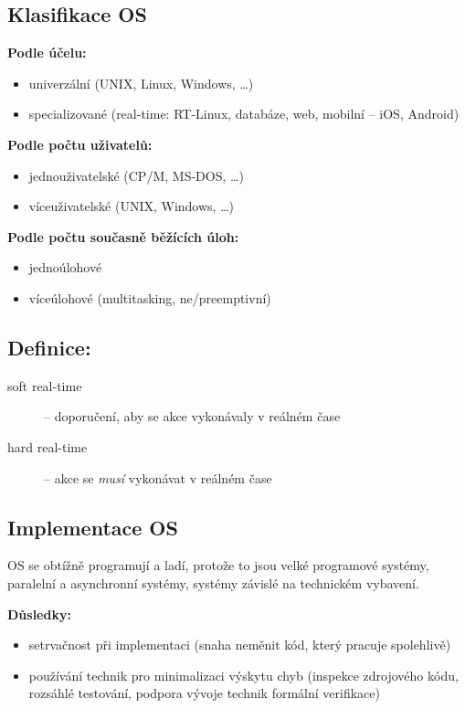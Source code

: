 \documentclass[a4paper, 11pt]{article}
\begin{document}
\newpage

\subsection{Klasifikace OS}

\textbf{Podle účelu:}
\begin{itemize}
    \item univerzální (UNIX, Linux, Windows, \ldots)
    \item specializované (real-time: RT-Linux, databáze, web, mobilní -- iOS, Android)
\end{itemize}

\textbf{Podle počtu uživatelů:}
\begin{itemize}
    \item jednouživatelské (CP/M, MS-DOS, \ldots)
    \item víceuživatelské (UNIX, Windows, \ldots)
\end{itemize}

\textbf{Podle počtu současně běžících úloh:}
\begin{itemize}
    \item jednoúlohové
    \item víceúlohové (multitasking, ne/preemptivní)
\end{itemize}

\subsection*{Definice:}
\begin{description}
\item[soft real-time] -- doporučení, aby se akce vykonávaly v reálném čase
\item[hard real-time] -- akce se \emph{musí} vykonávat v reálném čase
\end{description}

\subsection{Implementace OS}
OS se obtížně programují a ladí, protože to jsou velké programové systémy, paralelní a asynchronní systémy, systémy závislé na technickém vybavení.
 
\textbf{Důsledky:}
\begin{itemize}
    \item setrvačnost při implementaci (snaha neměnit kód, který pracuje spolehlivě)
    \item používání technik pro minimalizaci výskytu chyb (inspekce zdrojového kódu, rozsáhlé testování, podpora vývoje technik formální verifikace)
\end{itemize}
\end{document}
